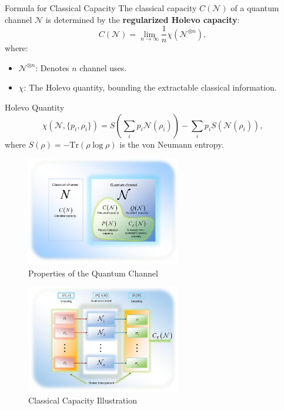 \begin{frame}{Formula for Classical Capacity}
    The classical capacity \( C(\mathcal{N}) \) of a quantum channel \( \mathcal{N} \) is determined by the \textbf{regularized Holevo capacity}:
    \begin{equation}
        C(\mathcal{N}) = \lim_{n \to \infty} \frac{1}{n} \chi\left(\mathcal{N}^{\otimes n}\right),
    \end{equation}
    where:
    \begin{itemize}
        \item \( \mathcal{N}^{\otimes n} \): Denotes \( n \) channel uses.
        \item \( \chi \): The Holevo quantity, bounding the extractable classical information.
    \end{itemize}

    \begin{block}{Holevo Quantity}
        \[
        \chi(\mathcal{N}, \{p_i, \rho_i\}) = S\left(\sum_i p_i \mathcal{N}(\rho_i)\right) - \sum_i p_i S\left(\mathcal{N}(\rho_i)\right),
        \]
        where \( S(\rho) = -\text{Tr}(\rho \log \rho) \) is the von Neumann entropy.
    \end{block}
\end{frame}

\begin{figure}[h]
    \centering
    \includegraphics[width=0.6\textwidth]{figures/properties_channels.png}
    \caption{Properties of the Quantum Channel \cite{Gyongyosi2012PropertiesOT}}
\end{figure}

\begin{figure}[h]
    \centering
    \includegraphics[width=0.6\textwidth]{figures/classical_cap.png}
    \caption{Classical Capacity Illustration \cite{6773024}}
\end{figure}
